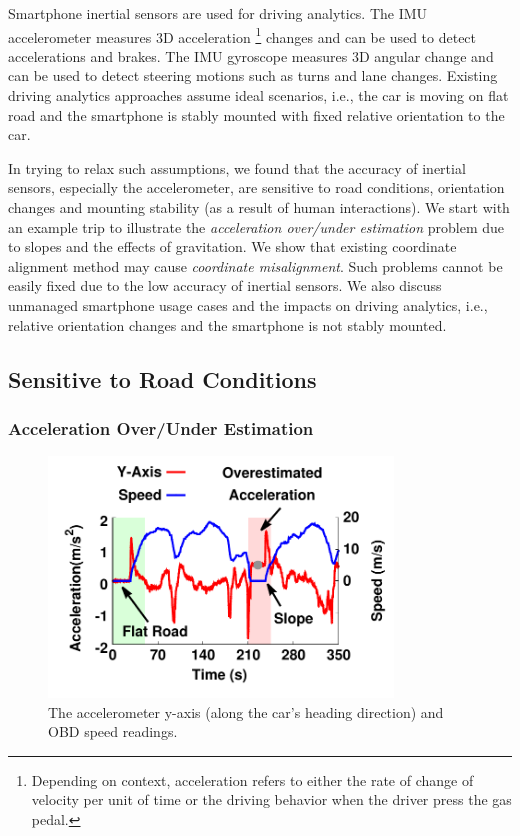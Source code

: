 
Smartphone inertial sensors are used for driving analytics. 
The IMU accelerometer measures 3D acceleration 
\footnote{Depending on context, acceleration refers to either the 
rate of change of velocity per unit of time or the driving behavior
when the driver press the gas pedal.} 
changes and can be used to detect accelerations and brakes. 
The IMU gyroscope measures 3D angular change and can be used
to detect steering motions such as turns and lane changes.
Existing driving analytics approaches \cite{wang2013sensing,hansenspeed,chen2015invisible} 
assume ideal scenarios, i.e., 
the car is moving on flat road and  
the smartphone is stably mounted
with fixed relative orientation to the car. 


In trying to relax such assumptions, 
we found that the accuracy of inertial sensors, 
especially the accelerometer, are sensitive to road conditions, 
orientation changes and mounting stability (as a result of human interactions). 
We start with an example trip to illustrate the 
\emph{acceleration over/under estimation} problem
due to slopes and the effects of gravitation.  
We show that existing coordinate alignment
method may cause \emph{coordinate misalignment}. 
Such problems cannot be easily fixed due to 
the low accuracy of inertial sensors. 
We also discuss unmanaged smartphone usage
cases and the impacts on driving analytics, 
i.e., relative orientation changes and the 
smartphone is not stably mounted. 

\subsection{Sensitive to Road Conditions}

\subsubsection{Acceleration Over/Under Estimation}



\begin{figure}[ht]
\centering
\includegraphics[width=3.6in,angle=0]{Figs/DriveSense/slopeaware/motivation.pdf}
\caption{The accelerometer y-axis (along the car's heading direction) and OBD speed readings.}         
\vspace{-0.2cm}
\label{motivation_a}
\centering
\end{figure}

